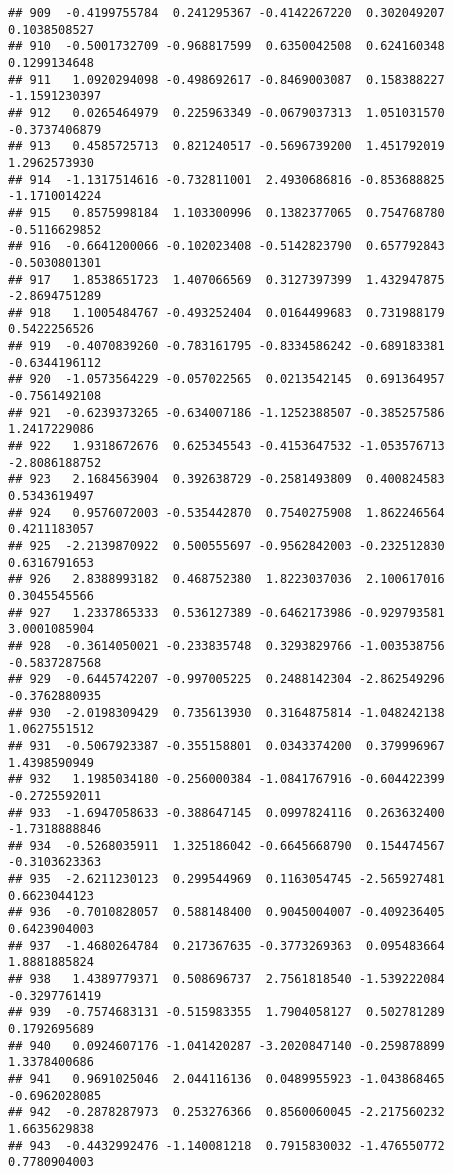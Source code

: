 \documentclass[
]{article}
\begin{document}
\begin{verbatim}
## 909  -0.4199755784  0.241295367 -0.4142267220  0.302049207  0.1038508527
## 910  -0.5001732709 -0.968817599  0.6350042508  0.624160348  0.1299134648
## 911   1.0920294098 -0.498692617 -0.8469003087  0.158388227 -1.1591230397
## 912   0.0265464979  0.225963349 -0.0679037313  1.051031570 -0.3737406879
## 913   0.4585725713  0.821240517 -0.5696739200  1.451792019  1.2962573930
## 914  -1.1317514616 -0.732811001  2.4930686816 -0.853688825 -1.1710014224
## 915   0.8575998184  1.103300996  0.1382377065  0.754768780 -0.5116629852
## 916  -0.6641200066 -0.102023408 -0.5142823790  0.657792843 -0.5030801301
## 917   1.8538651723  1.407066569  0.3127397399  1.432947875 -2.8694751289
## 918   1.1005484767 -0.493252404  0.0164499683  0.731988179  0.5422256526
## 919  -0.4070839260 -0.783161795 -0.8334586242 -0.689183381 -0.6344196112
## 920  -1.0573564229 -0.057022565  0.0213542145  0.691364957 -0.7561492108
## 921  -0.6239373265 -0.634007186 -1.1252388507 -0.385257586  1.2417229086
## 922   1.9318672676  0.625345543 -0.4153647532 -1.053576713 -2.8086188752
## 923   2.1684563904  0.392638729 -0.2581493809  0.400824583  0.5343619497
## 924   0.9576072003 -0.535442870  0.7540275908  1.862246564  0.4211183057
## 925  -2.2139870922  0.500555697 -0.9562842003 -0.232512830  0.6316791653
## 926   2.8388993182  0.468752380  1.8223037036  2.100617016  0.3045545566
## 927   1.2337865333  0.536127389 -0.6462173986 -0.929793581  3.0001085904
## 928  -0.3614050021 -0.233835748  0.3293829766 -1.003538756 -0.5837287568
## 929  -0.6445742207 -0.997005225  0.2488142304 -2.862549296 -0.3762880935
## 930  -2.0198309429  0.735613930  0.3164875814 -1.048242138  1.0627551512
## 931  -0.5067923387 -0.355158801  0.0343374200  0.379996967  1.4398590949
## 932   1.1985034180 -0.256000384 -1.0841767916 -0.604422399 -0.2725592011
## 933  -1.6947058633 -0.388647145  0.0997824116  0.263632400 -1.7318888846
## 934  -0.5268035911  1.325186042 -0.6645668790  0.154474567 -0.3103623363
## 935  -2.6211230123  0.299544969  0.1163054745 -2.565927481  0.6623044123
## 936  -0.7010828057  0.588148400  0.9045004007 -0.409236405  0.6423904003
## 937  -1.4680264784  0.217367635 -0.3773269363  0.095483664  1.8881885824
## 938   1.4389779371  0.508696737  2.7561818540 -1.539222084 -0.3297761419
## 939  -0.7574683131 -0.515983355  1.7904058127  0.502781289  0.1792695689
## 940   0.0924607176 -1.041420287 -3.2020847140 -0.259878899  1.3378400686
## 941   0.9691025046  2.044116136  0.0489955923 -1.043868465 -0.6962028085
## 942  -0.2878287973  0.253276366  0.8560060045 -2.217560232  1.6635629838
## 943  -0.4432992476 -1.140081218  0.7915830032 -1.476550772  0.7780904003

\end{verbatim}
\end{document}
